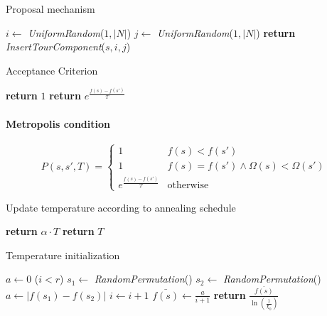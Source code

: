 \begin{homeworkProblem}
\begin{algorithm}
\caption{Proposal mechanism}
\label{SA:Prop}
\begin{algorithmic}
  \State $i \gets $ \emph{UniformRandom}($1,|N|$)
    \State $j \gets $ \emph{UniformRandom}($1,|N|$)
  \EndWhile  
  \State \textbf{return} \emph{InsertTourComponent}($s,i,j$)   
\EndProcedure
\end{algorithmic}
\end{algorithm}

\begin{algorithm}
\caption{Acceptance Criterion}
\label{saTSPTW}
\begin{algorithmic}
  \State \textbf{return} $1$
\Else
  \State \textbf{return} $e^{\frac{f(s)-f(s')}{T}}$
\EndIf
\EndProcedure
\end{algorithmic}
\end{algorithm}

\paragraph{Metropolis condition}
\begin{equation} \label{eq:metropolis}
  P(s,s',T) = \begin{cases}
               1 & f(s) < f(s') \\
               1 & f(s) = f(s') \wedge \Omega(s) < \Omega(s')\\
               e^{\frac{f(s)-f(s')}{T}} & \text{otherwise}
              \end{cases}
\end{equation}

\begin{algorithm}
\caption{Update temperature according to annealing schedule}
\label{saTSPTW}
\begin{algorithmic}
    \State \textbf{return} $\alpha \cdot T$
  \Else
    \State \textbf{return} $T$
  \EndIf
\EndProcedure
\end{algorithmic}
\end{algorithm}

\begin{algorithm}
\caption{Temperature initialization}
\label{saTInit}
\begin{algorithmic}
  \State $a \gets 0$
  \While($i < r$)
    \State $s_1 \gets$ \emph{RandomPermutation}()
    \State $s_2 \gets$ \emph{RandomPermutation}()
    \State $a \gets |f(s_1)-f(s_2)|$
    \State $i \gets i + 1$
  \EndWhile
  \State $\bar{f(s)} \gets \frac{a}{i+1}$
  \State \textbf{return} $\frac{\bar{f(s)}}{\ln(\frac{1}{\chi_0})}$
\EndProcedure
\end{algorithmic}
\end{algorithm}


\end{homeworkProblem}		
